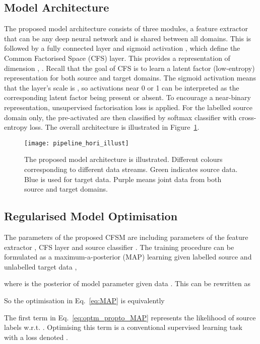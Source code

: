 \documentclass[letterpaper]{article} \usepackage{aaai19}  \usepackage{times}  \usepackage{helvet}  \usepackage{courier}  \usepackage{url}  \usepackage{graphicx}
\begin{document}
\subsection{Model Architecture}
The proposed model architecture consists of three modules, a feature extractor  that can be any deep neural network and is shared between all domains. This is followed by a fully connected layer and sigmoid activation , which define the Common Factorised Space (CFS) layer. This provides a representation of dimension , . Recall that the goal of CFS is to learn a latent factor (low-entropy) representation for both source and target domains. The sigmoid activation means that the layer's scale is , so activations near 0 or 1 can be interpreted as the corresponding latent factor being present or absent. To encourage a near-binary representation, unsupervised factorisation loss is applied.
For the labelled source domain only, the pre-activated  are then classified by softmax classifier  with cross-entropy loss. 
The overall architecture is illustrated in Figure~\ref{fig:model_arch_illus}.

\begin{figure}[t]
\centering    
\texttt{[image: pipeline\_hori\_illust]}
\caption{The proposed model architecture is illustrated. Different colours corresponding to different data streams. Green indicates source data. Blue is used for target data. Purple means joint data from both source and target domains.}
\label{fig:model_arch_illus}
\end{figure}



\subsection{Regularised Model Optimisation}
The parameters of the proposed CFSM are  including parameters of the feature extractor , CFS layer  and source classifier . The training procedure can be formulated as a maximum-a-posterior (MAP) learning given labelled source  and unlabelled target data ,

where  is the posterior of model parameter  given data .
This can be rewritten as



So the optimisation in Eq.~\ref{eq:MAP} is equivalently

The first term  in Eq.~\ref{eq:optm_propto_MAP} represents the likelihood of source labels w.r.t. . Optimising this term is a conventional supervised learning task with a loss denoted . 
\end{document}
